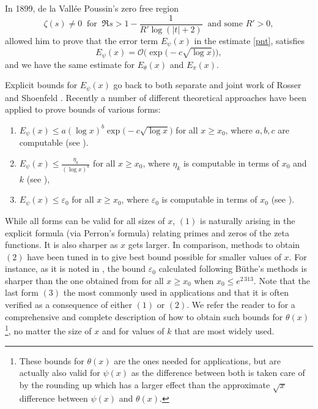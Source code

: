 \documentclass[10pt]{amsart}
\theoremstyle{definition}
\numberwithin{equation}{section}
\begin{document}
In 1899, de la Vall\'ee Poussin's zero free region 
\[
\zeta(s) \neq0 \ \text{ for }\ \Re s > 1-\frac{1}{R'\log(|t|+2)}\ \text{ and some }R'>0,
\] 
allowed him to prove that the error term $E_{\psi}(x)$
in the estimate \eqref{pnt}, satisfies
\begin{equation}\label{bnd-et-pnt}
E_{\psi}(x)= \mathcal{O}\big( \exp\big( -c \sqrt{\log x}\big)\big),
\end{equation}
and we have the same estimate for $E_{\theta}(x) $ and $E_{\pi}(x) $.



Explicit bounds for $E_{\psi}(x)$ go back to both separate and joint work of Rosser and Shoenfeld \cite{Rosser,RosserSchoenfeld1,RosserSchoenfeld2,Schoenfeld}.
Recently a number of different theoretical approaches have been applied to prove bounds of various forms:
\begin{enumerate}
\item 
$ E_{\psi}(x) \le a (\log x)^{b} \exp\big( -c \sqrt{\log x}\big)$ for all $x \ge x_0$, where $a,b,c$ are computable (see \cite{Tru16, Bu18, Naz18,PlaTru21ET}).
\item 
$ E_{\psi}(x) \le  \frac{\eta_k}{(\log x)^k}$ for all $x \ge x_0$, where $\eta_k$ is computable in terms of $x_0$ and $k$ (see \cite{Dus18, Naz18,BKLNW21}),
\item 
$ E_{\psi}(x) \le \varepsilon_0$ for all $x \ge x_0$, where $\varepsilon_0$ is computable in terms of $x_0$ (see \cite{FabKad15,Tru16, Dus18, Naz18, Bu18, BKLNW21}).
\end{enumerate}

While all forms can be valid for all sizes of $x$, $(1)$ is naturally arising in the explicit formula (via Perron's formula) relating primes and zeros of the zeta functions. It is also sharper as $x$ gets larger. 
In comparison, methods to obtain $(2)$ have been tuned in to give best bound possible for smaller values of $x$. 
For instance, as it is noted in \cite[Appendix $A_3$]{BKLNW21}, the bound $\varepsilon_0 $ calculated following B\"uthe's methods \cite{Bu16,Bu18,Joh22} is sharper than the one obtained from  \cite{PlaTru21ET} for all $x\ge x_0$ when $x_0\le e^{2\,313}$. 
Note that the last form $(3)$ the most commonly used in applications and that it is often verified as a consequence of either $(1)$ or $(2)$. We refer the reader to \cite{BKLNW21} for a comprehensive and complete description of how to obtain such bounds for $\theta(x)$\footnote{These bounds for $\theta(x)$ are the ones needed for applications, but are actually also valid for $\psi(x)$ as the difference between both is taken care of by the rounding up which has a larger effect than the approximate $\sqrt{x}$ difference between $\psi(x)$ and $\theta(x)$. },
 no matter the size of $x$ and for values of $k$ that are most widely used. 
%
\end{document}
